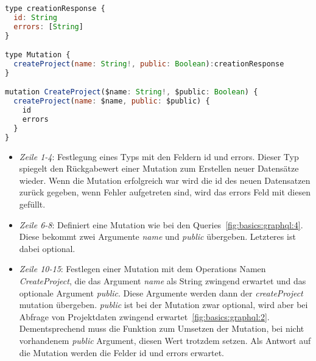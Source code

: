 \begin{lstlisting}[language=Javascript,float=h!,caption={GraphQL Mutation zum Erstellen eines Projektes}, label={fig:basics:graphql:7}]
type creationResponse {
  id: String
  errors: [String]
}

type Mutation {
  createProject(name: String!, public: Boolean):creationResponse
}

mutation CreateProject($name: String!, $public: Boolean) {
  createProject(name: $name, public: $public) {
    id
    errors
  }
}
\end{lstlisting}

\begin{itemize}
	\setlength\itemsep{-1em}
	\item \emph{Zeile 1-4}: Festlegung eines Typs mit den Feldern id und errors. Dieser Typ spiegelt den Rückgabewert einer Mutation zum Erstellen neuer Datensätze wieder. Wenn die Mutation erfolgreich war wird die id des neuen Datensatzen zurück gegeben, wenn Fehler aufgetreten sind, wird das errors Feld mit diesen gefüllt.
	\item \emph{Zeile 6-8}: Definiert eine Mutation wie bei den Queries~\ref{fig:basics:graphql:4}. Diese bekommt zwei Argumente \emph{name} und \emph{public} übergeben. Letzteres ist dabei optional.
	\item \emph{Zeile 10-15}: Festlegen einer Mutation mit dem Operations Namen \emph{CreateProject}, die das Argument \emph{name} als String zwingend erwartet und das optionale Argument \emph{public}.
	Diese Argumente werden dann der \emph{createProject} mutation übergeben.
	\emph{public} ist bei der Mutation zwar optional, wird aber bei Abfrage von Projektdaten zwingend erwartet~\ref{fig:basics:graphql:2}. Dementsprechend muss die Funktion zum Umsetzen der Mutation, bei nicht vorhandenem \emph{public} Argument, diesen Wert trotzdem setzen.
	Als Antwort auf die Mutation werden die Felder id und errors erwartet.
\end{itemize}











